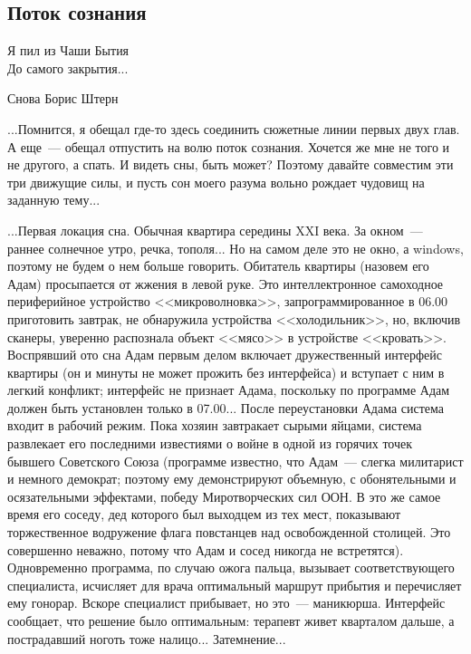 \documentclass{scrbook}
\makeatletter
\newcommand{\defaultepigraphwidth}{0.5} %
\newcommand{\flqq}{<<}
\newcommand{\frqq}{>>}
\newcommand{\mdash}{~--- }
\newcommand{\essaysection}[1]{\subsection*{#1}\nopagebreak}
\newcommand{\myepigraph}[3][\@empty]{
	\ifx\@empty#1
		\setlength{\epigraphwidth}{\defaultepigraphwidth\textwidth}
	\else
		\setlength{\epigraphwidth}{#1\textwidth}
	\fi
	\epigraph{#2}{#3}
	\setlength{\epigraphwidth}{\defaultepigraphwidth\textwidth} %
	\nopagebreak
}
\makeatother
\begin{document}
\essaysection{Поток сознания}

\myepigraph{Я пил из Чаши Бытия \\
До самого закрытия...}
{Снова Борис Штерн}

...Помнится, я обещал где-то здесь соединить сюжетные линии первых двух глав. А еще{\mdash}обещал отпустить на волю поток сознания. Хочется же мне не того и не другого, а спать. И видеть сны, быть может? Поэтому давайте совместим эти три движущие силы, и пусть сон моего разума вольно рождает чудовищ на заданную тему...

...Первая локация сна. Обычная квартира середины XXI века. За окном{\mdash}раннее солнечное утро, речка, тополя... Но на самом деле это не окно, а windows, поэтому не будем о нем больше говорить. Обитатель квартиры (назовем его Адам) просыпается от жжения в левой руке. Это интеллектронное самоходное периферийное устройство {\flqq}микроволновка{\frqq}, запрограммированное в 06.00 приготовить завтрак, не обнаружила устройства {\flqq}холодильник{\frqq}, но, включив сканеры, уверенно распознала объект {\flqq}мясо{\frqq} в устройстве {\flqq}кровать{\frqq}. Воспрявший ото сна Адам первым делом включает дружественный интерфейс квартиры (он и минуты не может прожить без интерфейса) и вступает с ним в легкий конфликт; интерфейс не признает Адама, поскольку по программе Адам должен быть установлен только в 07.00... После переустановки Адама система входит в рабочий режим. Пока хозяин завтракает сырыми яйцами, система развлекает его последними известиями о войне в одной из горячих точек бывшего Советского Союза (программе известно, что Адам{\mdash}слегка милитарист и немного демократ; поэтому ему демонстрируют объемную, с обонятельными и осязательными эффектами, победу Миротворческих сил ООН. В это же самое время его соседу, дед которого был выходцем из тех мест, показывают торжественное водружение флага повстанцев над освобожденной столицей. Это совершенно неважно, потому что Адам и сосед никогда не встретятся). Одновременно программа, по случаю ожога пальца, вызывает соответствующего специалиста, исчисляет для врача оптимальный маршрут прибытия и перечисляет ему гонорар. Вскоре специалист прибывает, но это{\mdash}маникюрша. Интерфейс сообщает, что решение было оптимальным: терапевт живет кварталом дальше, а пострадавший ноготь тоже налицо... Затемнение...
\end{document}

